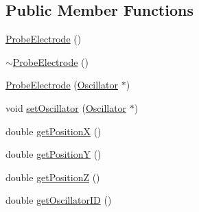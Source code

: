 \subsection*{Public Member Functions}
\begin{DoxyCompactItemize}
\item 
\hyperlink{class_probe_electrode_a25f662f416e9bfe5c3141749b8f3e4c1}{Probe\+Electrode} ()
\item 
\hyperlink{class_probe_electrode_a00dcd3547df479ca0b932958b2f3936b}{$\sim$\+Probe\+Electrode} ()
\item 
\hyperlink{class_probe_electrode_af60277157e608b2a9ea61b59f41bd772}{Probe\+Electrode} (\hyperlink{class_oscillator}{Oscillator} $\ast$)
\item 
void \hyperlink{class_probe_electrode_aeee592bae931530360c5102b2c968e0d}{set\+Oscillator} (\hyperlink{class_oscillator}{Oscillator} $\ast$)
\item 
double \hyperlink{class_probe_electrode_a33da81f5b1c8d14f610ed8e7407cbba9}{get\+Position\+X} ()
\item 
double \hyperlink{class_probe_electrode_a356cb0ec1bbdbbbe8aeddd4b90638da4}{get\+Position\+Y} ()
\item 
double \hyperlink{class_probe_electrode_a23b9f2c91bc2bb6952602ad9e644c72a}{get\+Position\+Z} ()
\item 
double \hyperlink{class_probe_electrode_a9ae2fc3f864c4c8f9971b4f4b35e7022}{get\+Oscillator\+I\+D} ()
\end{DoxyCompactItemize}


